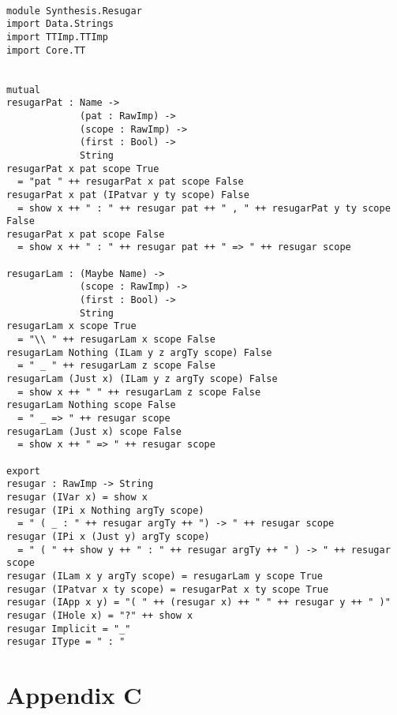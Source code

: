 \documentclass[a4paper]{article}
\begin{document}
\begin{center}
\begin{verbatim}

module Synthesis.Resugar 
import Data.Strings
import TTImp.TTImp
import Core.TT


mutual
resugarPat : Name ->
			 (pat : RawImp) ->
			 (scope : RawImp) ->
			 (first : Bool) ->
			 String
resugarPat x pat scope True 
  = "pat " ++ resugarPat x pat scope False
resugarPat x pat (IPatvar y ty scope) False 
  = show x ++ " : " ++ resugar pat ++ " , " ++ resugarPat y ty scope False
resugarPat x pat scope False
  = show x ++ " : " ++ resugar pat ++ " => " ++ resugar scope

resugarLam : (Maybe Name) ->
			 (scope : RawImp) -> 
			 (first : Bool) ->
			 String
resugarLam x scope True
  = "\\ " ++ resugarLam x scope False
resugarLam Nothing (ILam y z argTy scope) False
  = " _ " ++ resugarLam z scope False
resugarLam (Just x) (ILam y z argTy scope) False
  = show x ++ " " ++ resugarLam z scope False
resugarLam Nothing scope False
  = " _ => " ++ resugar scope 
resugarLam (Just x) scope False
  = show x ++ " => " ++ resugar scope

export
resugar : RawImp -> String
resugar (IVar x) = show x
resugar (IPi x Nothing argTy scope) 
  = " ( _ : " ++ resugar argTy ++ ") -> " ++ resugar scope
resugar (IPi x (Just y) argTy scope) 
  = " ( " ++ show y ++ " : " ++ resugar argTy ++ " ) -> " ++ resugar scope
resugar (ILam x y argTy scope) = resugarLam y scope True
resugar (IPatvar x ty scope) = resugarPat x ty scope True
resugar (IApp x y) = "( " ++ (resugar x) ++ " " ++ resugar y ++ " )"
resugar (IHole x) = "?" ++ show x
resugar Implicit = "_"
resugar IType = " : "

\end{verbatim}
\end{center}
\clearpage
\section{Appendix C}
\label{sec:orgcb130c1}
\end{document}
